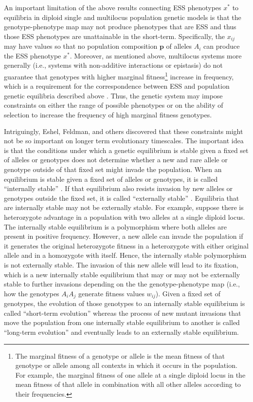 \documentclass[11pt]{article}
\newcommand{\ess}[1]{#1^*}
\renewcommand{\vec}[1]{\symbf{#1}}
\begin{document}
An important limitation of the above results connecting ESS phenotypes $\ess{x}$ to equilibria in diploid single and multilocus population genetic models is that the genotype-phenotype map may not produce phenotypes that are ESS and thus those ESS phenotypes are unattainable in the short-term. Specifically, the $x_{ij}$ may have values so that no population composition $\vec{p}$ of alleles $A_{i}$ can produce the ESS phenotype $\ess{x}$. Moreover, as mentioned above, multilocus systems more generally (i.e., systems with non-additive interactions or epistasis) do not guarantee that genotypes with higher marginal fitness\footnote{The marginal fitness of a genotype or allele is the mean fitness of that genotype or allele among all contexts in which it occurs in the population. For example, the marginal fitness of one allele at a single diploid locus in the mean fitness of that allele in combination with all other alleles according to their frequencies.} increase in frequency, which is a requirement for the correspondence between ESS and population genetic equilibria described above \cite{Eshel:1982,Hofbauer:Sigmund:1998}. Thus, the genetic system may impose constraints on either the range of possible phenotypes or on the ability of selection to increase the frequency of high marginal fitness genotypes.

Intriguingly, Eshel, Feldman, and others discovered that these constraints might not be so important on longer term evolutionary timescales. The important idea is that the conditions under which a genetic equilibrium is stable given a fixed set of alleles or genotypes does not determine whether a new and rare allele or genotype outside of that fixed set might invade the population. When an equilibrium is stable given a fixed set of alleles or genotypes, it is called ``internally stable'' \cite{Eshel:1996}. If that equilibrium also resists invasion by new alleles or genotypes outside the fixed set, it is called ``externally stable'' \cite{Liberman:1988,Eshel:1996}. Equilibria that are internally stable may not be externally stable. For example, suppose there is heterozygote advantage in a population with two alleles at a single diploid locus. The internally stable equilibrium is a polymorphism where both alleles are present in positive frequency. However, a new allele can invade the population if it generates the original heterozygote fitness in a heterozygote with either original allele and in a homozygote with itself. Hence, the internally stable polymorphism is not externally stable. The invasion of this new allele will lead to its fixation, which is a new internally stable equilibrium that may or may not be externally stable to further invasions depending on the the genotype-phenotype map (i.e., how the genotypes $A_{i} A_{j}$ generate fitness values $w_{ij}$). Given a fixed set of genotypes, the evolution of those genotypes to an internally stable equilibrium is called ``short-term evolution'' whereas the process of new mutant invasions that move the population from one internally stable equilibrium to another is called ``long-term evolution'' \cite{Eshel:1991,Eshel:1996,Hammerstein:1996,Weissing:1996,Eshel:Feldman:1998,VanCleve:2015,VanCleve:2020} and eventually leads to an externally stable equilibrium.
\end{document}
